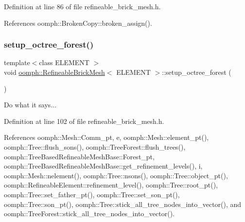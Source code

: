 Definition at line 86 of file refineable\+\_\+brick\+\_\+mesh.\+h.



References oomph\+::\+Broken\+Copy\+::broken\+\_\+assign().

\mbox{\label{classoomph_1_1RefineableBrickMesh_a7488ae090e09e3f1e01b20a2c2c7a188}} 
\subsubsection{\texorpdfstring{setup\+\_\+octree\+\_\+forest()}{setup\_octree\_forest()}}
{\footnotesize\ttfamily template$<$class E\+L\+E\+M\+E\+NT $>$ \\
void \hyperlink{classoomph_1_1RefineableBrickMesh}{oomph\+::\+Refineable\+Brick\+Mesh}$<$ E\+L\+E\+M\+E\+NT $>$\+::setup\+\_\+octree\+\_\+forest (\begin{DoxyParamCaption}{ }\end{DoxyParamCaption})\hspace{0.3cm}{\ttfamily [inline]}}



Do what it says... 



Definition at line 102 of file refineable\+\_\+brick\+\_\+mesh.\+h.



References oomph\+::\+Mesh\+::\+Comm\+\_\+pt, e, oomph\+::\+Mesh\+::element\+\_\+pt(), oomph\+::\+Tree\+::flush\+\_\+sons(), oomph\+::\+Tree\+Forest\+::flush\+\_\+trees(), oomph\+::\+Tree\+Based\+Refineable\+Mesh\+Base\+::\+Forest\+\_\+pt, oomph\+::\+Tree\+Based\+Refineable\+Mesh\+Base\+::get\+\_\+refinement\+\_\+levels(), i, oomph\+::\+Mesh\+::nelement(), oomph\+::\+Tree\+::nsons(), oomph\+::\+Tree\+::object\+\_\+pt(), oomph\+::\+Refineable\+Element\+::refinement\+\_\+level(), oomph\+::\+Tree\+::root\+\_\+pt(), oomph\+::\+Tree\+::set\+\_\+father\+\_\+pt(), oomph\+::\+Tree\+::set\+\_\+son\+\_\+pt(), oomph\+::\+Tree\+::son\+\_\+pt(), oomph\+::\+Tree\+::stick\+\_\+all\+\_\+tree\+\_\+nodes\+\_\+into\+\_\+vector(), and oomph\+::\+Tree\+Forest\+::stick\+\_\+all\+\_\+tree\+\_\+nodes\+\_\+into\+\_\+vector().



